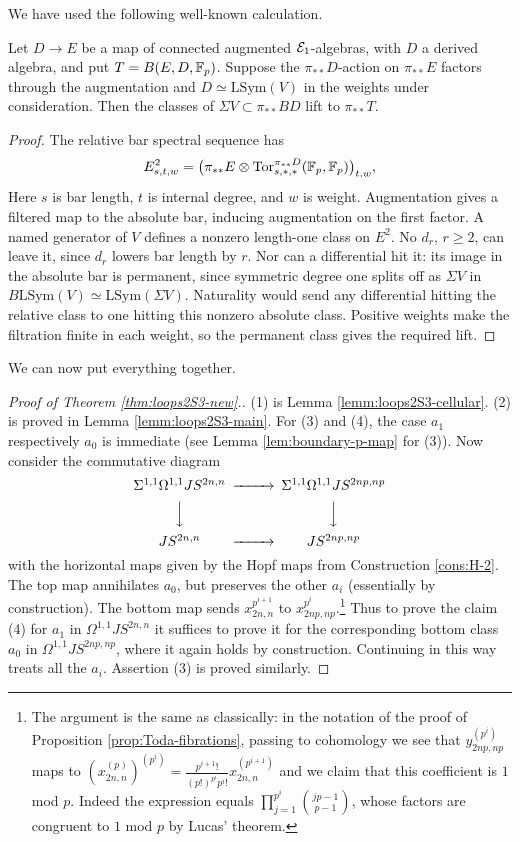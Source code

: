 \documentclass{amsart}
\numberwithin{proposition}{section}
\numberwithin{equation}{section}
\def\LSym{\mathrm{LSym}}
\begin{document}
We have used the following well-known calculation.
\begin{lemma} \label{lemm:Toda-bar-lifts}
Let $D\to E$ be a map of connected augmented $\mathcal E_1$-algebras, with $D$ a derived algebra, and put $T=B(E,D,\mathbb{F}_p)$.
Suppose the $\pi_{**}D$-action on $\pi_{**}E$ factors through the augmentation and $D\simeq\LSym(V)$ in the weights under consideration.
Then the classes of $\Sigma V\subset \pi_{**}BD$ lift to $\pi_{**}T$.
\end{lemma}
\begin{proof}
The relative bar spectral sequence has \[ E^2_{s,t,w}=\bigl(\pi_{**} E\otimes \operatorname{Tor}^{\pi_{**}D}_{s,*,*}(\mathbb{F}_p,\mathbb{F}_p)\bigr)_{t,w}, \]
Here $s$ is bar length, $t$ is internal degree, and $w$ is weight.
Augmentation gives a filtered map to the absolute bar, inducing augmentation on the first factor.
A named generator of $V$ defines a nonzero length-one class on $E^2$.
No $d_r$, $r\ge2$, can leave it, since $d_r$ lowers bar length by $r$.
Nor can a differential hit it: its image in the absolute bar is permanent, since symmetric degree one splits off as $\Sigma V$ in $B\LSym(V)\simeq\LSym(\Sigma V)$.
Naturality would send any differential hitting the relative class to one hitting this nonzero absolute class.
Positive weights make the filtration finite in each weight, so the permanent class gives the required lift.
\end{proof}

We can now put everything together.
\begin{proof}[Proof of Theorem \ref{thm:loops2S3-new}.]
(1) is Lemma \ref{lemm:loops2S3-cellular}.
(2) is proved in Lemma \ref{lemm:loops2S3-main}.
For (3) and (4), the case $a_1$ respectively $a_0$ is immediate (see Lemma \ref{lem:boundary-p-map} for (3)).
Now consider the commutative diagram
\begin{equation*}
\begin{CD}
\Sigma^{1,1}\Omega^{1,1} JS^{2n,n} @>>> \Sigma^{1,1}\Omega^{1,1} JS^{2np,np} \\
@VVV         @VVV \\
JS^{2n,n} @>>> JS^{2np,np} \\
\end{CD}
\end{equation*}
with the horizontal maps given by the Hopf maps from Construction \ref{cons:H-2}.
The top map annihilates $a_0$, but preserves the other $a_i$ (essentially by construction).
The bottom map sends $x_{2n,n}^{p^{i+1}}$ to $x_{2np,np}^{p^i}$.\footnote{The argument is the same as classically: in the notation of the proof of Proposition \ref{prop:Toda-fibrations}, passing to cohomology we see that $y_{2np,np}^{(p^i)}$ maps to $(x_{2n,n}^{(p)})^{(p^i)} = \frac{p^{i+1}!}{(p!)^{p^i}p^i!}x_{2n,n}^{(p^{i+1})}$ and we claim that this coefficient is $1$ mod $p$. Indeed the expression equals $\prod_{j=1}^{p^i}\binom{jp-1}{p-1}$, whose factors are congruent to $1$ mod $p$ by Lucas' theorem.}
Thus to prove the claim (4) for $a_1$ in $\Omega^{1,1}JS^{2n,n}$ it suffices to prove it for the corresponding bottom class $a_0$ in $\Omega^{1,1}JS^{2np,np}$, where it again holds by construction.
Continuing in this way treats all the $a_i$.
Assertion (3) is proved similarly.
\end{proof}
\end{document}
